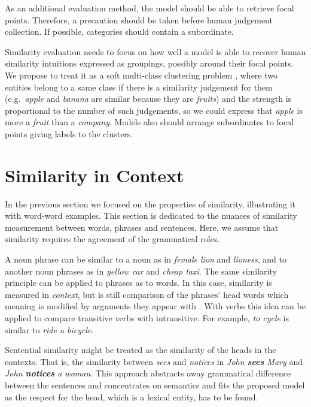 \documentclass[11pt]{article}
\begin{document}
As an additional evaluation method, the model should be able to retrieve focal points. Therefore, a precaution should be taken before human judgement collection. If possible, categories should contain a subordinate.

Similarity evaluation needs to focus on how well a model is able to recover human similarity intuitions expressed as groupings, possibly around their focal points. We propose to treat it as a soft multi-class clustering problem \cite{White:2015:WSE:2838931.2838932}, where two entities belong to a same class if there is a similarity judgement for them (e.g.~\textit{apple} and \textit{banana} are similar because they are \textit{fruits}) and the strength is proportional to the number of such judgements, so we could express that \textit{apple} is more a \textit{fruit} than a \textit{company}. Models also should arrange subordinates to focal points giving labels to the clusters.

\section{Similarity in Context}

In the previous section we focused on the properties of similarity, illustrating it with word-word examples. This section is dedicated to the nuances of similarity measurement between words, phrases and sentences. Here, we assume that similarity requires the agreement of the grammatical roles.

A noun phrase can be similar to a noun as in \textit{female lion} and \textit{lioness}, and to another noun phrases as in \textit{yellow car} and \textit{cheap taxi}. The same similarity principle can be applied to phrases as to words. In this case, similarity is measured in \emph{context}, but is still comparison of the phrases' head words which meaning is modified by arguments they appear with \cite{Kintsch2001173,mitchell-lapata:2008:ACLMain,mitchell2010composition,Dinu:2010:MDS:1870658.1870771,Baroni2010nouns,thater-furstenau-pinkal:2011:IJCNLP-2011,Seaghdha:2011:PMS:2145432.2145545}. With verbs this idea can be applied to compare transitive verbs with intransitive. For example, \textit{to cycle} is similar to \textit{ride a bicycle}.


Sentential similarity might be treated as the similarity of the heads in the contexts. That is, the similarity between \textit{sees} and \textit{notices} in \textit{John \textbf{sees} Mary} and \textit{John \textbf{notices} a woman}. This approach abstracts away grammatical difference between the sentences and concentrates on semantics and fits the proposed model as the respect for the head, which is a lexical entity, has to be found.
\end{document}
